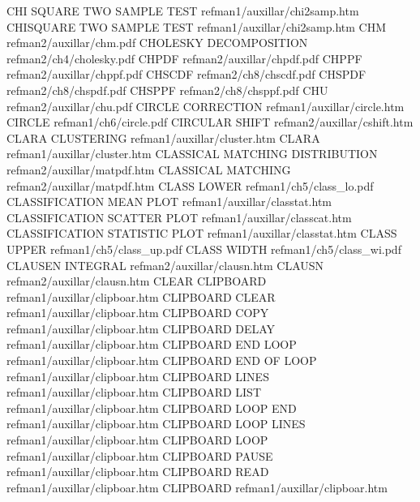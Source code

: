 CHI SQUARE TWO SAMPLE TEST              refman1/auxillar/chi2samp.htm
CHISQUARE TWO SAMPLE TEST               refman1/auxillar/chi2samp.htm
CHM                                     refman2/auxillar/chm.pdf
CHOLESKY DECOMPOSITION                  refman2/ch4/cholesky.pdf
CHPDF                                   refman2/auxillar/chpdf.pdf
CHPPF                                   refman2/auxillar/chppf.pdf
CHSCDF                                  refman2/ch8/chscdf.pdf
CHSPDF                                  refman2/ch8/chspdf.pdf
CHSPPF                                  refman2/ch8/chsppf.pdf
CHU                                     refman2/auxillar/chu.pdf
CIRCLE CORRECTION                       refman1/auxillar/circle.htm
CIRCLE                                  refman1/ch6/circle.pdf
CIRCULAR SHIFT                          refman2/auxillar/cshift.htm
CLARA CLUSTERING                        refman1/auxillar/cluster.htm
CLARA                                   refman1/auxillar/cluster.htm
CLASSICAL MATCHING DISTRIBUTION         refman2/auxillar/matpdf.htm
CLASSICAL MATCHING                      refman2/auxillar/matpdf.htm
CLASS LOWER                             refman1/ch5/class_lo.pdf
CLASSIFICATION MEAN PLOT                refman1/auxillar/classtat.htm
CLASSIFICATION SCATTER PLOT             refman1/auxillar/classcat.htm
CLASSIFICATION STATISTIC PLOT           refman1/auxillar/classtat.htm
CLASS UPPER                             refman1/ch5/class_up.pdf
CLASS WIDTH                             refman1/ch5/class_wi.pdf
CLAUSEN INTEGRAL                        refman2/auxillar/clausn.htm
CLAUSN                                  refman2/auxillar/clausn.htm
CLEAR CLIPBOARD                         refman1/auxillar/clipboar.htm
CLIPBOARD CLEAR                         refman1/auxillar/clipboar.htm
CLIPBOARD COPY                          refman1/auxillar/clipboar.htm
CLIPBOARD DELAY                         refman1/auxillar/clipboar.htm
CLIPBOARD END LOOP                      refman1/auxillar/clipboar.htm
CLIPBOARD END OF LOOP                   refman1/auxillar/clipboar.htm
CLIPBOARD LINES                         refman1/auxillar/clipboar.htm
CLIPBOARD LIST                          refman1/auxillar/clipboar.htm
CLIPBOARD LOOP END                      refman1/auxillar/clipboar.htm
CLIPBOARD LOOP LINES                    refman1/auxillar/clipboar.htm
CLIPBOARD LOOP                          refman1/auxillar/clipboar.htm
CLIPBOARD PAUSE                         refman1/auxillar/clipboar.htm
CLIPBOARD READ                          refman1/auxillar/clipboar.htm
CLIPBOARD                               refman1/auxillar/clipboar.htm
